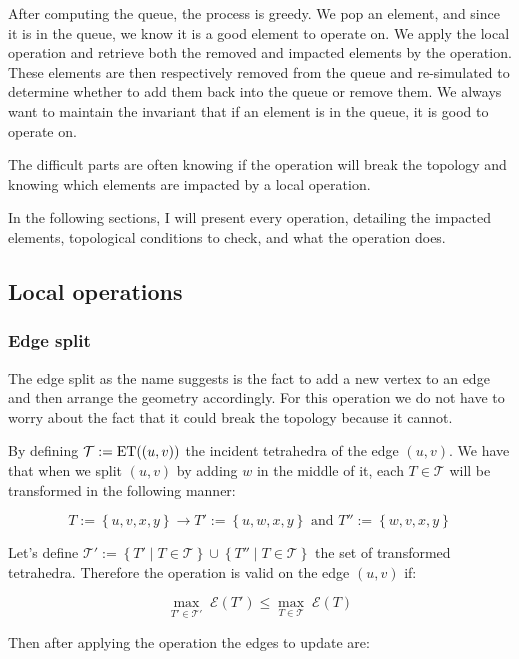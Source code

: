 \documentclass[11pt]{article}
\begin{document}


After computing the queue, the process is greedy. We pop an element, and since it is in the queue, we know it is a good element to operate on. We apply the local operation and retrieve both the removed and impacted elements by the operation. These elements are then respectively removed from the queue and re-simulated to determine whether to add them back into the queue or remove them. We always want to maintain the invariant that if an element is in the queue, it is good to operate on.

The difficult parts are often knowing if the operation will break the topology and knowing which elements are impacted by a local operation.

In the following sections, I will present every operation, detailing the impacted elements, topological conditions to check, and what the operation does.
\subsection{Local operations}

\subsubsection{Edge split}



The edge split as the name suggests is the fact to add a new vertex to an edge and then arrange the geometry
accordingly. For this operation we do not have to worry about the fact that it could break the topology
because it cannot.

By defining $\mathcal{T} := \mathrm{ET}((u,v))$ the incident tetrahedra of the edge $(u,v)$. We have that when we
split $(u,v)$ by adding $w$ in the middle of it, each $T\in\mathcal{T}$ will be transformed in the following manner:

$$T := \left\{u,v,x,y\right\} \longrightarrow T' := \left\{u,w,x,y\right\} \text{ and }
	T'' :=\left\{w,v,x,y\right\}$$

Let's define $\mathcal{T}' := \left\{T'\; |\; T\in\mathcal{T}\right\} \cup \left\{T''\; |\; T\in\mathcal{T}\right\}$ the set of transformed tetrahedra. Therefore the operation is valid on the edge $(u,v)$ if:

$$\underset{T'\in\mathcal{T}'}{\max}\;\mathcal{E}(T')\leq\underset{T\in\mathcal{T}}{\max}\;\mathcal{E}(T)$$

Then after applying the operation the edges to update are:
\end{document}
